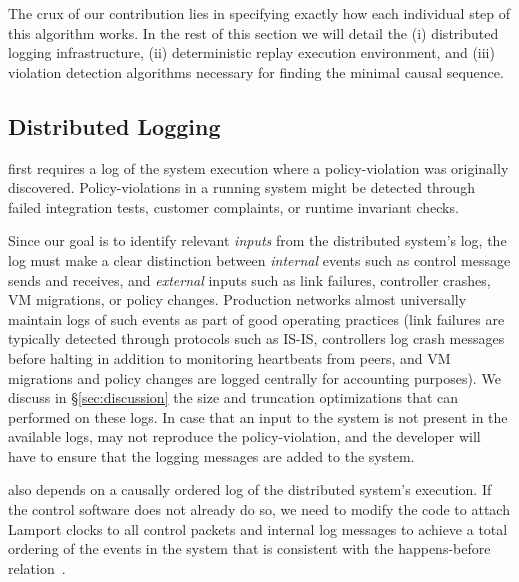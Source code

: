 The crux of our contribution lies in specifying exactly how each
individual step of this algorithm works. In the rest of this section we will
detail the (i) distributed logging infrastructure, (ii) deterministic
replay execution environment, and (iii) violation detection algorithms
necessary for finding the minimal causal sequence.

\subsection{Distributed Logging}

\Simulator{} first requires a log of the system execution where a
policy-violation was originally discovered. Policy-violations
in a running system might be detected through failed integration tests,
customer complaints, or runtime invariant checks.

Since our goal is to identify
relevant {\em inputs} from the distributed system's log, the log must make a clear
distinction between {\em internal} events such as control message sends and
receives, and {\em external} inputs such as
link failures, controller crashes, VM migrations, or policy changes.
Production networks almost universally maintain logs of such events as part of
good operating practices (link failures are typically detected through
protocols such as IS-IS,
controllers log crash messages before
halting in addition to monitoring heartbeats from peers, and VM migrations and
policy changes are logged centrally for accounting purposes). We discuss in
\S\ref{sec:discussion} the size and truncation optimizations that
can performed on these logs. In case
that an input to the system is not present in the available logs,
\simulator{} may not reproduce the policy-violation, and the developer will
have to ensure that the logging messages are added to the system.

\Simulator{} also depends on a causally ordered log of the
distributed system's execution. If the control software does not already do
so, we need to modify the code to attach Lamport
clocks to all
control packets and internal log messages
to achieve a total ordering of the events in the system that
is consistent with the happens-before
relation~\cite{Lamport:1978:TCO:359545.359563}.


